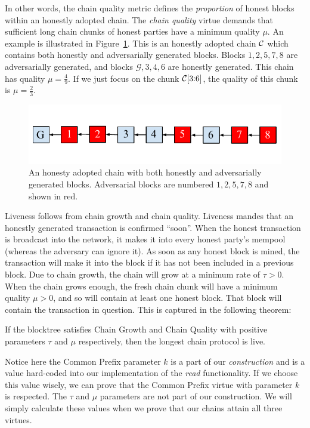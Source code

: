In other words, the chain quality metric defines the \emph{proportion} of honest blocks
within an honestly adopted chain. The \emph{chain quality} virtue demands that
sufficient long chain chunks of honest parties have a minimum quality $\mu$. An example
is illustrated in Figure~\ref{fig.chain-quality}. This is an honestly adopted chain $\mathcal{C}$
which contains both honestly and adversarially generated blocks. Blocks $1, 2, 5, 7, 8$
are adversarially generated, and blocks $\mathcal{G}, 3, 4, 6$ are honestly generated.
This chain has quality $\mu = \frac{4}{9}$. If we just focus on the chunk $\mathcal{C}[3{:}6]$,
the quality of this chunk is $\mu = \frac{2}{3}$.

\begin{figure}[h]
    \centering
    \includegraphics[width=0.7 \columnwidth,keepaspectratio]{figures/chain-quality.pdf}
    \caption{An honesty adopted chain with both honestly and adversarially generated blocks.
             Adversarial blocks are numbered $1, 2, 5, 7, 8$ and shown in red.}
    \label{fig.chain-quality}
\end{figure}

Liveness follows from chain growth and chain quality.
Liveness mandes that an honestly generated transaction is confirmed ``soon''.
When the honest transaction is broadcast into the network, it makes it into every
honest party's mempool (whereas the adversary can ignore it). As soon as any honest
block is mined, the transaction will make it into the block if it has not been
included in a previous block. Due to chain growth, the chain will grow at a minimum
rate of $\tau > 0$. When the chain grows enough, the fresh chain chunk will have a minimum
quality $\mu > 0$, and so will contain at least one honest block. That block will
contain the transaction in question. This is captured in the following theorem:

\begin{theorem}
    If the blocktree satisfies Chain Growth and Chain Quality with positive parameters $\tau$
    and $\mu$ respectively, then the longest chain protocol is live.
\end{theorem}

Notice here the Common Prefix parameter $k$ is a part of our \emph{construction} and is a value
hard-coded into our implementation of the \emph{read} functionality. If we choose this value
wisely, we can prove that the Common Prefix virtue with parameter $k$ is respected. The $\tau$
and $\mu$ parameters are not part of our construction. We will simply calculate these values
when we prove that our chains attain all three virtues.

